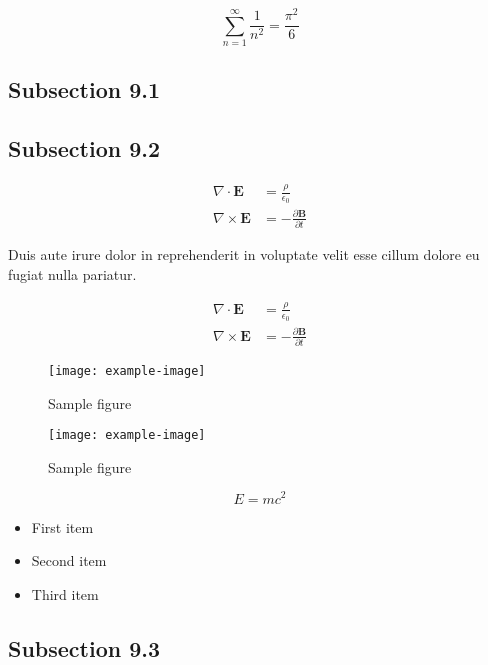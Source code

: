 \documentclass{article}
\begin{document}
\begin{equation}
    \sum_{n=1}^{\infty} \frac{1}{n^2} = \frac{\pi^2}{6}
\end{equation}

\subsection{Subsection 9.1}


\subsection{Subsection 9.2}

\begin{align}
    \nabla \cdot \mathbf{E} &= \frac{\rho}{\epsilon_0} \\
    \nabla \times \mathbf{E} &= -\frac{\partial \mathbf{B}}{\partial t}
\end{align}


Duis aute irure dolor in reprehenderit in voluptate velit esse cillum dolore eu fugiat nulla pariatur.

\begin{align}
    \nabla \cdot \mathbf{E} &= \frac{\rho}{\epsilon_0} \\
    \nabla \times \mathbf{E} &= -\frac{\partial \mathbf{B}}{\partial t}
\end{align}

\begin{figure}[h]
    \centering
    \texttt{[image: example-image]}
    \caption{Sample figure}
    \label{fig:sample}
\end{figure}

\begin{figure}[h]
    \centering
    \texttt{[image: example-image]}
    \caption{Sample figure}
    \label{fig:sample}
\end{figure}


\begin{equation}
    E = mc^2
\end{equation}

\begin{itemize}
\item First item
\item Second item
\item Third item
\end{itemize}


\subsection{Subsection 9.3}
\end{document}
